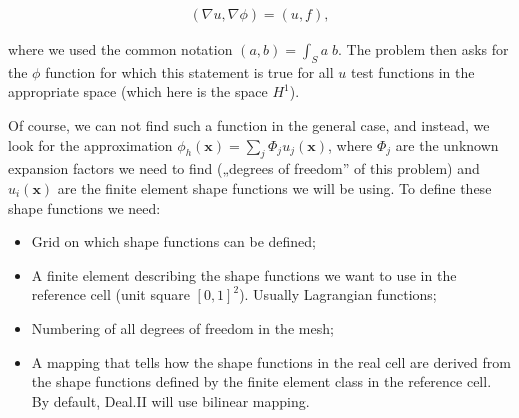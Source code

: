 \documentclass[]{pracamgr}
\begin{document}
      \begin{align*}
        (\nabla u, \nabla \phi)
         = (u, f),
      \end{align*}

      where we used the common notation $(a,b)=\int_S a\; b$. The problem then asks for the $\phi$ function for which this statement is true for all $u$ test functions in the appropriate space (which here is the space $H^1$).

      Of course, we can not find such a function in the general case, and instead, we look for the approximation $\phi_h(\mathbf x)=\sum_j \Phi_j u_j(\mathbf x)$, where $\Phi_j$ are the unknown expansion factors we need to find („degrees of freedom” of this problem) and $u_i(\mathbf x)$ are the finite element shape functions we will be using. To define these shape functions we need:
      
      \begin{itemize}
        \item Grid on which shape functions can be defined;
        \item A finite element describing the shape functions we want to use in the reference cell (unit square $[0,1]^2$). Usually Lagrangian functions;
        \item Numbering of all degrees of freedom in the mesh;
        \item A mapping that tells how the shape functions in the real cell are derived from the shape functions defined by the finite element class in the reference cell. By default, Deal.II will use bilinear mapping.
      \end{itemize}
\end{document}
